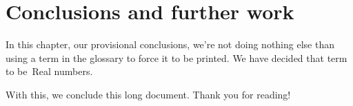 
\chapter{Conclusions and further work}
\label{ch:conclusions}

In this chapter, our provisional conclusions, we're not doing nothing else than using a term in the glossary to force it to be printed.
We have decided that term to be~\gls{Real numbers}.

With this, we conclude this long document.
Thank you for reading!



